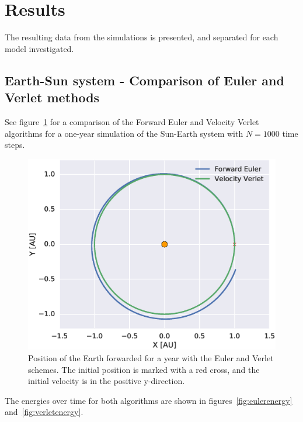 \documentclass[aps,reprint]{revtex4-1}
\begin{document}
\section{Results}
The resulting data from the simulations is presented, and separated for each
model investigated.
\label{sec:results}
\subsection{Earth-Sun system - Comparison of Euler and Verlet methods}
\label{sec:earthsunresults}
See figure~\ref{fig:earthsunorbits} for a comparison of the Forward Euler and
Velocity Verlet algorithms for a one-year simulation of the Sun-Earth system with
$N = 1000$ time steps.
\begin{figure}[H]
  \centering
  \includegraphics[width=\columnwidth]{figures/eulerverlet.eps}
  \caption{Position of the Earth forwarded for a year with the Euler and Verlet
  schemes. The initial position is marked with a red cross, and the initial
  velocity is in the positive y-direction.}
  \label{fig:earthsunorbits}
\end{figure}
The energies over time for both algorithms
are shown in figures~\ref{fig:eulerenergy} and~\ref{fig:verletenergy}.
\end{document}

